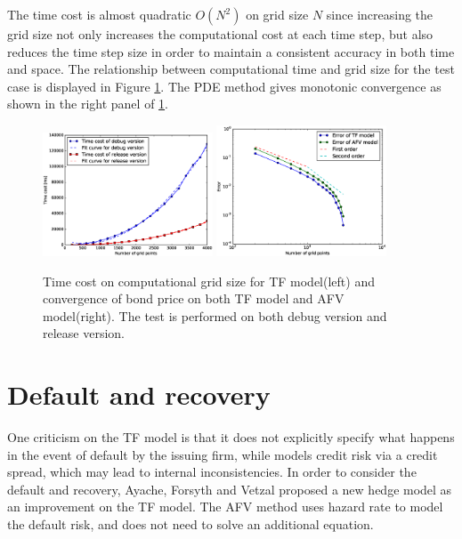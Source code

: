 \documentclass[12pt]{article}
\begin{document}
The time cost is almost quadratic $O(N^2)$ on grid size $N$ since increasing the grid size not only increases the computational cost at each time step, but also reduces the time step size in order to maintain a consistent accuracy in both time and space. The relationship between computational time and grid size for the test case is displayed in Figure \ref{fig:time_cost}. The PDE method gives monotonic convergence as shown in the right panel of \ref{fig:time_cost}.
\begin{figure}[!htbp]
\centering
\includegraphics[width=0.45\textwidth]{Figures/timecost}
\includegraphics[width=0.45\textwidth]{Figures/converge}
\caption{Time cost on computational grid size for TF model(left) and convergence of bond price on both TF model and AFV model(right). The test is performed on both debug version and release version.}
\label{fig:time_cost}
\end{figure}

\section{Default and recovery}
One criticism on the TF model is that it does not explicitly specify what happens in the event of default by the issuing firm, while models credit risk via a credit spread, which may lead to internal inconsistencies. In order to consider the default and recovery, Ayache, Forsyth and Vetzal proposed a new hedge model as an improvement on the TF model. The AFV method uses hazard rate to model the default risk, and does not need to solve an additional equation. 
\end{document}
